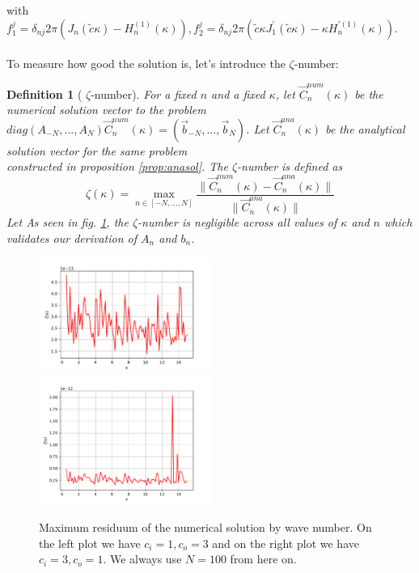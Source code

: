 \documentclass[10pt,journal,compsoc, onecolumn]{IEEEtran}
\newtheorem{definition}[theorem]{Definition}
\begin{document}
with $f_1^j =  \delta_{nj} 2\pi (J_n(\tilde c \kappa) - H_n^{(1)}(\kappa)), f_2^j = \delta_{nj} 2\pi (\tilde c \kappa J_1^{\prime}(\tilde c\kappa) - \kappa H_n^{\prime(1)}(\kappa))$.\\
\\
To measure how good the solution is, let's introduce the $\zeta$-number: 
\begin{definition}[ $\zeta$-number]
    For a fixed $n$ and a fixed $\kappa$, let $\vec{C}^{num}_n(\kappa)$ be the numerical solution vector to the problem \\
    $diag(A_{-N}, ..., A_N) \vec{C}^{num}_n(\kappa) = (\vec{b}_{-N}, ... , \vec{b}_{N})$. 
    Let $\vec{C}^{ana}_n(\kappa)$ be the analytical solution vector for the same problem \\
    constructed in proposition \ref{prop:anasol}.
    The $\zeta$-number is defined as 
    $$
        \zeta(\kappa)=  \max\limits_{n \in [-N, ..., N]}\frac{\|\vec{C}^{num}_n(\kappa) - \vec{C}^{ana}_n(\kappa)\|}{\|\vec{C}^{ana}_n(\kappa)\|}
    $$ Let 
As seen in fig. \ref{fig:sol_validation}, the $\zeta$-number is negligible across all values of $\kappa$ and $n$ which validates our derivation of $A_n$ and $b_n$.
\end{definition}
\begin{figure}
    \includegraphics[width=0.5\textwidth]{scenario1SolVal.pdf}
    \includegraphics[width=0.5\textwidth]{scenario2SolVal.pdf}
    \caption{Maximum residuum of the numerical solution by wave number. 
    On the left plot we have $c_i = 1, c_o = 3$ 
    and on the right plot we have $c_i = 3, c_o = 1.$
    We always use $N = 100$ from here on.}
    \label{fig:sol_validation}
\end{figure}
\end{document}
